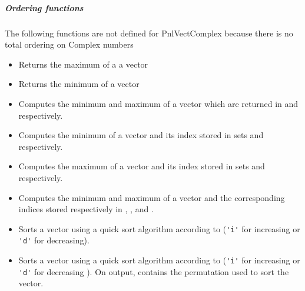 \subparagraph{Ordering functions}
The following functions are not defined for PnlVectComplex because there is
no total ordering on Complex numbers

\begin{itemize}
\item {}
  \sshortdescribe Returns the maximum of a a vector  

\item {}
  \sshortdescribe Returns the minimum of a vector  

\item {}
  \sshortdescribe Computes the minimum and maximum of a vector which are
  returned in   and  respectively.
  
\item {}
  \sshortdescribe Computes the minimum of a vector and its index stored in 
  sets  and  respectively.

\item {}
  \sshortdescribe Computes the maximum of a vector and its index stored in 
  sets  and  respectively.

\item {}
  \sshortdescribe Computes the minimum and maximum of a vector and the
  corresponding indices stored respectively in , ,  and
  .

\item {}
  \sshortdescribe Sorts a vector using a quick sort algorithm according to
   (\verb!'i'! for increasing or \verb!'d'! for decreasing).

\item {}
  \sshortdescribe Sorts a vector using a quick sort algorithm according to
   (\verb!'i'! for increasing or \verb!'d'! for decreasing ). On
  output,  contains the permutation used to sort the vector.
\end{itemize}

